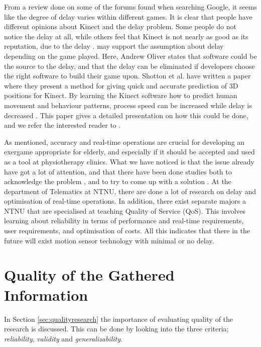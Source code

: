 From a review done on some of the forums found when searching Google, it seems like the degree of delay varies within different games. It is clear that people have different opinions about Kinect and the delay problem. Some people do not notice the delay at all, while others feel that Kinect is not nearly as good as its reputation, due to the delay \cite{kinectLagForum1} \cite{kinectLagForum2}. \cite{kinectLag} may support the assumption about delay depending on the game played. Here, Andrew Oliver states that software could be the source to the delay, and that the delay can be eliminated if developers choose the right software to build their game upon. Shotton et al. \cite{artikkelKinectLag} have written a paper where they present a method for giving quick and accurate prediction of 3D positions for Kinect. By learning the Kinect software how to predict human movement and behaviour patterns, process speed can be increased while delay is decreased \cite{artikkelKinectLag} \cite{artikkelKinectLagIntro}. This paper gives a detailed presentation on how this could be done, and we refer the interested reader to \cite{artikkelKinectLag}.       

As mentioned, accuracy and real-time operations are crucial for developing an exergame appropriate for elderly, and especially if it should be accepted and used as a tool at physiotherapy clinics. What we have noticed is that the issue already have got a lot of attention, and that there have been done studies both to acknowledge the problem \cite{leyvand2011kinect}, and to try to come up with a solution \cite{artikkelKinectLag}. At the department of Telematics at NTNU, there are done a lot of research on delay and optimisation of real-time operations. In addition, there exist separate majors a NTNU that are specialised at teaching Quality of Service (QoS). This involves learning about reliability in terms of performance and real-time requirements, user requirements, and optimisation of costs. All this indicates that there in the future will exist motion sensor technology with minimal or no delay. 

\section{Quality of the Gathered Information}
\label{sec:qualityofresearch}

In Section \ref{sec:qualityresearch} the importance of evaluating quality of the research is discussed. This can be done by looking into the three criteria; \emph{reliability}, \emph{validity} and \emph{generalizability}.    

